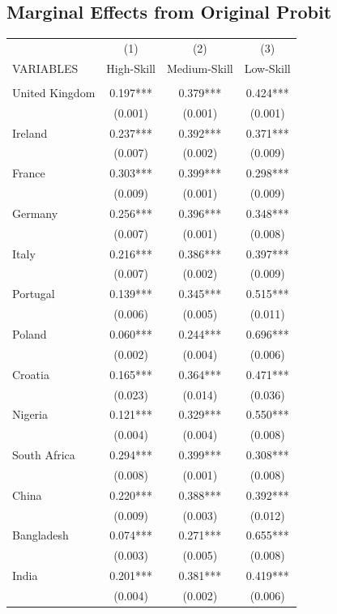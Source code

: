 \documentclass[12pt, a4paper]{article}
\begin{document}
\subsection{Marginal Effects from Original Probit}
\begin{table}[H]
    \centering
\begin{tabularx}{\textwidth}{@{}lCCC@{}} \hline
 & (1) & (2) & (3) \\
VARIABLES & High-Skill & Medium-Skill & Low-Skill \\ \hline
 &  &  &  \\
United Kingdom & 0.197*** & 0.379*** & 0.424*** \\
 & (0.001) & (0.001) & (0.001) \\
Ireland & 0.237*** & 0.392*** & 0.371*** \\
 & (0.007) & (0.002) & (0.009) \\
France & 0.303*** & 0.399*** & 0.298*** \\
 & (0.009) & (0.001) & (0.009) \\
Germany & 0.256*** & 0.396*** & 0.348*** \\
 & (0.007) & (0.001) & (0.008) \\
Italy & 0.216*** & 0.386*** & 0.397*** \\
 & (0.007) & (0.002) & (0.009) \\
Portugal & 0.139*** & 0.345*** & 0.515*** \\
 & (0.006) & (0.005) & (0.011) \\
Poland & 0.060*** & 0.244*** & 0.696*** \\
 & (0.002) & (0.004) & (0.006) \\
Croatia & 0.165*** & 0.364*** & 0.471*** \\
 & (0.023) & (0.014) & (0.036) \\
Nigeria & 0.121*** & 0.329*** & 0.550*** \\
 & (0.004) & (0.004) & (0.008) \\
South Africa & 0.294*** & 0.399*** & 0.308*** \\
 & (0.008) & (0.001) & (0.008) \\
China & 0.220*** & 0.388*** & 0.392*** \\
 & (0.009) & (0.003) & (0.012) \\
Bangladesh & 0.074*** & 0.271*** & 0.655*** \\
 & (0.003) & (0.005) & (0.008) \\
India & 0.201*** & 0.381*** & 0.419*** \\
 & (0.004) & (0.002) & (0.006) \\

\end{tabularx}
\end{table}
\end{document}

